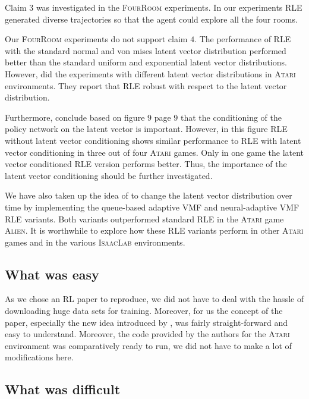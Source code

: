 \documentclass[10pt]{article} %
\begin{document}
Claim $3$ was investigated in the \textsc{FourRoom} experiments. In our experiments \textsc{RLE} generated diverse trajectories so that the agent could explore all the four rooms.

Our \textsc{FourRoom} experiments do not support claim $4$. The performance of \textsc{RLE} with the standard normal and von mises latent vector distribution performed better than the standard uniform and exponential latent vector distributions. However, \cite{rle-paper} did the experiments with different latent vector distributions in \textsc{Atari} environments. They report that \textsc{RLE} robust with respect to the latent vector distribution.

Furthermore, \cite{rle-paper} conclude based on figure $9$ page $9$ that the conditioning of the policy network on the latent vector is important. However, in this figure \textsc{RLE} without latent vector conditioning shows similar performance to \textsc{RLE} with latent vector conditioning in three out of four \textsc{Atari} games. Only in one game the latent vector conditioned \textsc{RLE} version performs better. Thus, the importance of the latent vector conditioning should be further investigated.

We have also taken up the idea of \cite{rle-paper} to change the latent vector distribution over time by implementing the queue-based adaptive VMF and neural-adaptive VMF \textsc{RLE} variants. Both variants outperformed standard \textsc{RLE} in the \textsc{Atari} game \textsc{Alien}. It is worthwhile to explore how these \textsc{RLE} variants perform in other \textsc{Atari} games and in the various \textsc{IsaacLab} environments.

\subsection{What was easy}

As we chose an RL paper to reproduce, we did not have to deal with the hassle of downloading huge data sets for training. Moreover, for us the concept of the paper, especially the new idea introduced by \cite{rle-paper}, was fairly straight-forward and easy to understand. Moreover, the code provided by the authors for the \textsc{Atari} environment was comparatively ready to run, we did not have to make a lot of modifications here.

\subsection{What was difficult}
\end{document}
